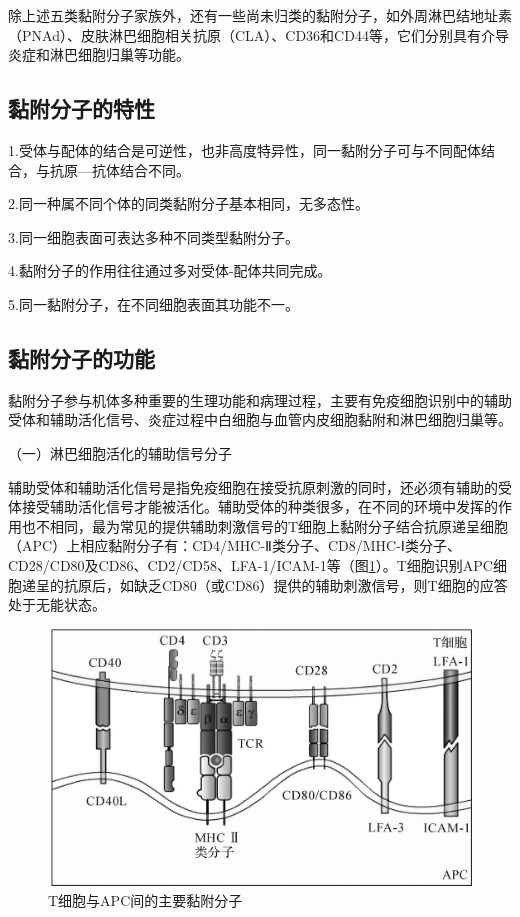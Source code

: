 除上述五类黏附分子家族外，还有一些尚未归类的黏附分子，如外周淋巴结地址素（PNAd）、皮肤淋巴细胞相关抗原（CLA）、CD36和CD44等，它们分别具有介导炎症和淋巴细胞归巢等功能。


\subsection{黏附分子的特性}

1.受体与配体的结合是可逆性，也非高度特异性，同一黏附分子可与不同配体结合，与抗原---抗体结合不同。

2.同一种属不同个体的同类黏附分子基本相同，无多态性。

3.同一细胞表面可表达多种不同类型黏附分子。

4.黏附分子的作用往往通过多对受体-配体共同完成。

5.同一黏附分子，在不同细胞表面其功能不一。


\subsection{黏附分子的功能}

黏附分子参与机体多种重要的生理功能和病理过程，主要有免疫细胞识别中的辅助受体和辅助活化信号、炎症过程中白细胞与血管内皮细胞黏附和淋巴细胞归巢等。

（一）淋巴细胞活化的辅助信号分子

辅助受体和辅助活化信号是指免疫细胞在接受抗原刺激的同时，还必须有辅助的受体接受辅助活化信号才能被活化。辅助受体的种类很多，在不同的环境中发挥的作用也不相同，最为常见的提供辅助刺激信号的T细胞上黏附分子结合抗原递呈细胞（APC）上相应黏附分子有：CD4/MHC-Ⅱ类分子、CD8/MHC-Ⅰ类分子、CD28/CD80及CD86、CD2/CD58、LFA-1/ICAM-1等（图\ref{fig8-9}）。T细胞识别APC细胞递呈的抗原后，如缺乏CD80（或CD86）提供的辅助刺激信号，则T细胞的应答处于无能状态。

\begin{figure}[!htbp]
 \centering
 \includegraphics{./images/Image00119.jpg}
 \captionsetup{justification=centering}
 \caption{T细胞与APC间的主要黏附分子}
 \label{fig8-9}
  \end{figure} 

